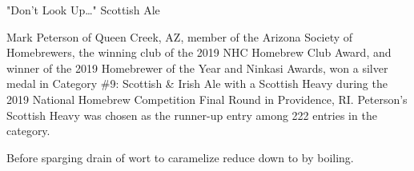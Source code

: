 \stylesection{\stylescottishheavy}

\begin{recipe}{"Don't Look Up\ldots" Scottish Ale}

\begin{aboutblock}
Mark Peterson of Queen Creek, AZ, member of the Arizona Society of Homebrewers,
the winning club of the 2019 NHC Homebrew Club Award, and winner of the 2019
Homebrewer of the Year and Ninkasi Awards, won a silver medal in Category \#9:
Scottish \& Irish Ale with a Scottish Heavy during the 2019 National Homebrew
Competition Final Round in Providence, RI. Peterson's Scottish Heavy was chosen
as the runner-up entry among 222 entries in the category. \sourceaha
\end{aboutblock}


\begin{methodandtiming}
 
\begin{mashsteps}
\end{mashsteps}

\begin{fermentationsteps}
\end{fermentationsteps}

\begin{directions}
Before sparging drain  of wort to caramelize reduce down to 
by boiling.
\end{directions}

\end{methodandtiming}

\recipebreak

\begin{ingredientsblock}

\begin{malts}
\end{malts}

\begin{hops}
\end{hops}


\end{ingredientsblock}

\end{recipe}
